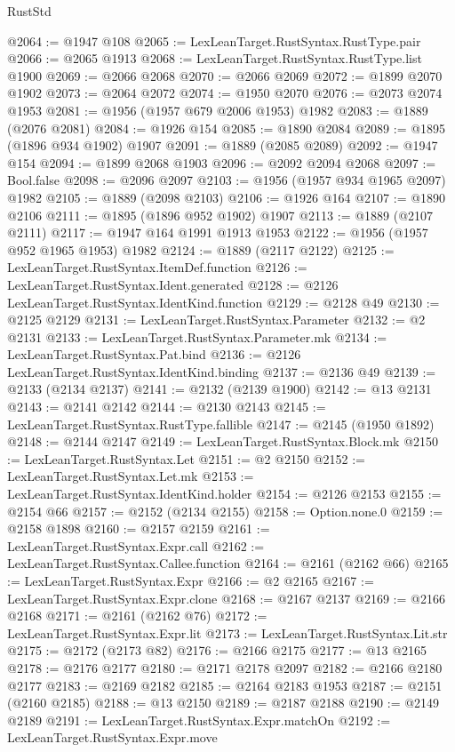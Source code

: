 \begin{lexlean}{RustStd}
\begin{coremodule}
@2064 := @1947 @108
@2065 := LexLeanTarget.RustSyntax.RustType.pair
@2066 := @2065 @1913
@2068 := LexLeanTarget.RustSyntax.RustType.list @1900
@2069 := @2066 @2068
@2070 := @2066 @2069
@2072 := @1899 @2070 @1902
@2073 := @2064 @2072
@2074 := @1950 @2070
@2076 := @2073 @2074 @1953
@2081 := @1956 (@1957 @679 @2006 @1953) @1982
@2083 := @1889 (@2076 @2081)
@2084 := @1926 @154
@2085 := @1890 @2084
@2089 := @1895 (@1896 @934 @1902) @1907
@2091 := @1889 (@2085 @2089)
@2092 := @1947 @154
@2094 := @1899 @2068 @1903
@2096 := @2092 @2094 @2068
@2097 := Bool.false
@2098 := @2096 @2097
@2103 := @1956 (@1957 @934 @1965 @2097) @1982
@2105 := @1889 (@2098 @2103)
@2106 := @1926 @164
@2107 := @1890 @2106
@2111 := @1895 (@1896 @952 @1902) @1907
@2113 := @1889 (@2107 @2111)
@2117 := @1947 @164 @1991 @1913 @1953
@2122 := @1956 (@1957 @952 @1965 @1953) @1982
@2124 := @1889 (@2117 @2122)
@2125 := LexLeanTarget.RustSyntax.ItemDef.function
@2126 := LexLeanTarget.RustSyntax.Ident.generated
@2128 := @2126 LexLeanTarget.RustSyntax.IdentKind.function
@2129 := @2128 @49
@2130 := @2125 @2129
@2131 := LexLeanTarget.RustSyntax.Parameter
@2132 := @2 @2131
@2133 := LexLeanTarget.RustSyntax.Parameter.mk
@2134 := LexLeanTarget.RustSyntax.Pat.bind
@2136 := @2126 LexLeanTarget.RustSyntax.IdentKind.binding
@2137 := @2136 @49
@2139 := @2133 (@2134 @2137)
@2141 := @2132 (@2139 @1900)
@2142 := @13 @2131
@2143 := @2141 @2142
@2144 := @2130 @2143
@2145 := LexLeanTarget.RustSyntax.RustType.fallible
@2147 := @2145 (@1950 @1892)
@2148 := @2144 @2147
@2149 := LexLeanTarget.RustSyntax.Block.mk
@2150 := LexLeanTarget.RustSyntax.Let
@2151 := @2 @2150
@2152 := LexLeanTarget.RustSyntax.Let.mk
@2153 := LexLeanTarget.RustSyntax.IdentKind.holder
@2154 := @2126 @2153
@2155 := @2154 @66
@2157 := @2152 (@2134 @2155)
@2158 := Option.none.{0}
@2159 := @2158 @1898
@2160 := @2157 @2159
@2161 := LexLeanTarget.RustSyntax.Expr.call
@2162 := LexLeanTarget.RustSyntax.Callee.function
@2164 := @2161 (@2162 @66)
@2165 := LexLeanTarget.RustSyntax.Expr
@2166 := @2 @2165
@2167 := LexLeanTarget.RustSyntax.Expr.clone
@2168 := @2167 @2137
@2169 := @2166 @2168
@2171 := @2161 (@2162 @76)
@2172 := LexLeanTarget.RustSyntax.Expr.lit
@2173 := LexLeanTarget.RustSyntax.Lit.str
@2175 := @2172 (@2173 @82)
@2176 := @2166 @2175
@2177 := @13 @2165
@2178 := @2176 @2177
@2180 := @2171 @2178 @2097
@2182 := @2166 @2180 @2177
@2183 := @2169 @2182
@2185 := @2164 @2183 @1953
@2187 := @2151 (@2160 @2185)
@2188 := @13 @2150
@2189 := @2187 @2188
@2190 := @2149 @2189
@2191 := LexLeanTarget.RustSyntax.Expr.matchOn
@2192 := LexLeanTarget.RustSyntax.Expr.move

\end{coremodule}
\end{lexlean}
